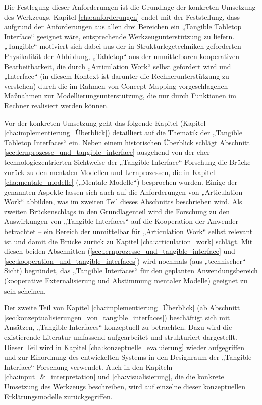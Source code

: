 Die Festlegung dieser Anforderungen ist die Grundlage der konkreten Umsetzung des Werkzeugs. Kapitel \ref{cha:anforderungen} endet mit der Feststellung, dass aufgrund der Anforderungen aus allen drei Bereichen ein „Tangible Tabletop Interface“ geeignet wäre, entsprechende Werkzeugunterstützung zu liefern. „Tangible“ motiviert sich dabei aus der in Strukturlegetechniken geforderten Physikalität der Abbildung, „Tabletop“ aus der unmittelbaren kooperativen Bearbeitbarkeit, die durch „Articulation Work“ selbst gefordert wird und „Interface“ (in diesem Kontext ist darunter die Rechnerunterstützung zu verstehen) durch die im Rahmen von Concept Mapping vorgeschlagenen Maßnahmen zur Modellierungsunterstützung, die nur durch Funktionen im Rechner realisiert werden können.

Vor der konkreten Umsetzung geht das folgende Kapitel (Kapitel \ref{cha:implementierung_Überblick}) detailliert auf die Thematik der „Tangible Tabletop Interfaces“ ein. Neben einem historischen Überblick schlägt Abschnitt \ref{sec:lernprozesse_und_tangible_interface} ausgehend von der eher technologiezentrierten Sichtweise der „Tangible Interface“-Forschung die Brücke zurück zu den mentalen Modellen und Lernprozessen, die in Kapitel \ref{cha:mentale_modelle} („Mentale Modelle“) besprochen wurden. Einige der genannten Aspekte lassen sich auch auf die Anforderungen von „Articulation Work“ abbilden, was im zweiten Teil dieses Abschnitts beschrieben wird. Als zweiten Brückenschlags in den Grundlagenteil wird die Forschung zu den Auswirkungen von „Tangible Interfaces“ auf die Kooperation der Anwender betrachtet -- ein Bereich der unmittelbar für „Articulation Work“ selbst relevant ist und damit die Brücke zurück zu Kapitel \ref{cha:articulation_work} schlägt. Mit diesen beiden Abschnitten (\ref{sec:lernprozesse_und_tangible_interface} und \ref{sec:kooperation_und_tangible_interfaces}) wird nochmals (aus „technischer“ Sicht) begründet, das „Tangible Interfaces“ für den geplanten Anwendungsbereich (kooperative Externalisierung und Abstimmung mentaler Modelle) geeignet zu sein scheinen.

Der zweite Teil von Kapitel \ref{cha:implementierung_Überblick} (ab Abschnitt \ref{sec:konzeptualisierungen_von_tangible_interfaces}) beschäftigt sich mit Ansätzen, „Tangible Interfaces“ konzeptuell zu betrachten. Dazu wird die existierende Literatur umfassend aufgearbeitet und strukturiert dargestellt. Dieser Teil wird in Kapitel \ref{cha:konzeptuelle_evaluierung} wieder aufgegriffen und zur Einordnung des entwickelten Systems in den Designraum der „Tangible Interface“-Forschung verwendet. Auch in den Kapiteln \ref{cha:input_&_interpretation} und \ref{cha:visualisierung}, die die konkrete Umsetzung des Werkzeugs beschreiben, wird auf einzelne dieser konzeptuellen Erklärungsmodelle zurückgegriffen.


